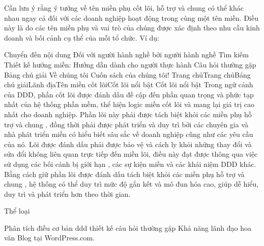 





Cần lưu ý rằng ý tưởng về tên miền phụ cốt lõi, hỗ trợ và chung có thể khác nhau ngay cả đối với các doanh nghiệp hoạt động trong cùng một tên miền. Điều này là do các tên miền phụ và vai trò của chúng được xác định theo nhu cầu kinh doanh và bối cảnh cụ thể của mỗi tổ chức. Ví dụ:


Chuyển đến nội dung
Đối với người hành nghề bởi người hành nghề
Tìm kiếm
Thiết kế hướng miền: Hướng dẫn dành cho người thực hành
Câu hỏi thường gặp
Bảng chú giải
Về chúng tôi
Cuốn sách của chúng tôi!
Trang chủTrang chủBảng chú giảiLãnh địaTên miền cốt lõiCốt lõi nổi bật
Cốt lõi nổi bật
Trong ngữ cảnh của DDD, phần cốt lõi được đánh dấu đề cập đến phần quan trọng và phức tạp nhất của hệ thống phần mềm, thể hiện logic miền cốt lõi và mang lại giá trị cao nhất cho doanh nghiệp. Phần lõi này phải được tách biệt khỏi các miền phụ hỗ trợ và chung , đồng thời phải được phát triển và duy trì bởi các chuyên gia và nhà phát triển miền có hiểu biết sâu sắc về doanh nghiệp cũng như các yêu cầu của nó. Lõi được đánh dấu phải được bảo vệ và cách ly khỏi những thay đổi và sửa đổi không liên quan trực tiếp đến miền lõi, điều này đạt được thông qua việc sử dụng các bối cảnh bị giới hạn , các sự kiện miền và các khái niệm DDD khác. Bằng cách giữ phần lõi được đánh dấu tách biệt khỏi các miền phụ hỗ trợ và chung , hệ thống có thể duy trì mức độ gắn kết và mô đun hóa cao, giúp dễ hiểu, duy trì và phát triển hơn theo thời gian.


Thể loại

Phân tích
điều cơ bản
ddd
thiết kế
câu hỏi thường gặp
Khả năng lãnh đạo
hoa văn
Blog tại WordPress.com.






